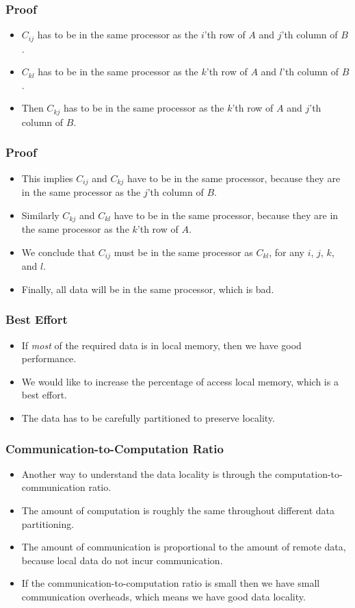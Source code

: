 \documentclass{beamer}
\begin{document}
\begin{CJK}{UTF8}{bsmi}
\begin{frame}
\frametitle{Proof}
\begin{itemize}
\item $C_{ij}$ has to be in the same processor as the $i$'th row of
  $A$ and $j$'th column of $B$.
\item $C_{kl}$ has to be in the same processor as the $k$'th row of
  $A$ and $l$'th column of $B$.
\item Then $C_{kj}$ has to be in the same processor as the $k$'th row of
  $A$ and $j$'th column of $B$.
\end{itemize}
\end{frame}

\begin{frame}
\frametitle{Proof}
\begin{itemize}
\item This implies $C_{ij}$ and $C_{kj}$ have to be in the same
  processor, because they are in the same processor as the $j$'th column
  of $B$.
\item Similarly $C_{kj}$ and $C_{kl}$ have to be in the same
  processor, because they are in the same processor as the $k$'th row
  of $A$.
\item We conclude that $C_{ij}$ must be in the same processor as
  $C_{kl}$, for any $i$, $j$, $k$, and $l$.
\item Finally, all data will be in the same processor, which is bad.
\end{itemize}
\end{frame}

\begin{frame}
\frametitle{Best Effort}
\begin{itemize}
\item If {\em most} of the required data is in local memory, then we
  have good performance.
\item We would like to increase the percentage of access local memory,
  which is a best effort.
\item The data has to be carefully partitioned to preserve locality.
\end{itemize}
\end{frame}

\begin{frame}
\frametitle{Communication-to-Computation Ratio}
\begin{itemize}
\item Another way to understand the data locality is through the
  computation-to-communication ratio.
\item The amount of computation is roughly the same throughout
  different data partitioning.
\item The amount of communication is proportional to the amount of
  remote data, because local data do not incur communication.
\item If the communication-to-computation ratio is small then we have
  small communication overheads, which means we have good data
  locality.
\end{itemize}
\end{frame}


\end{CJK}
\end{document}
